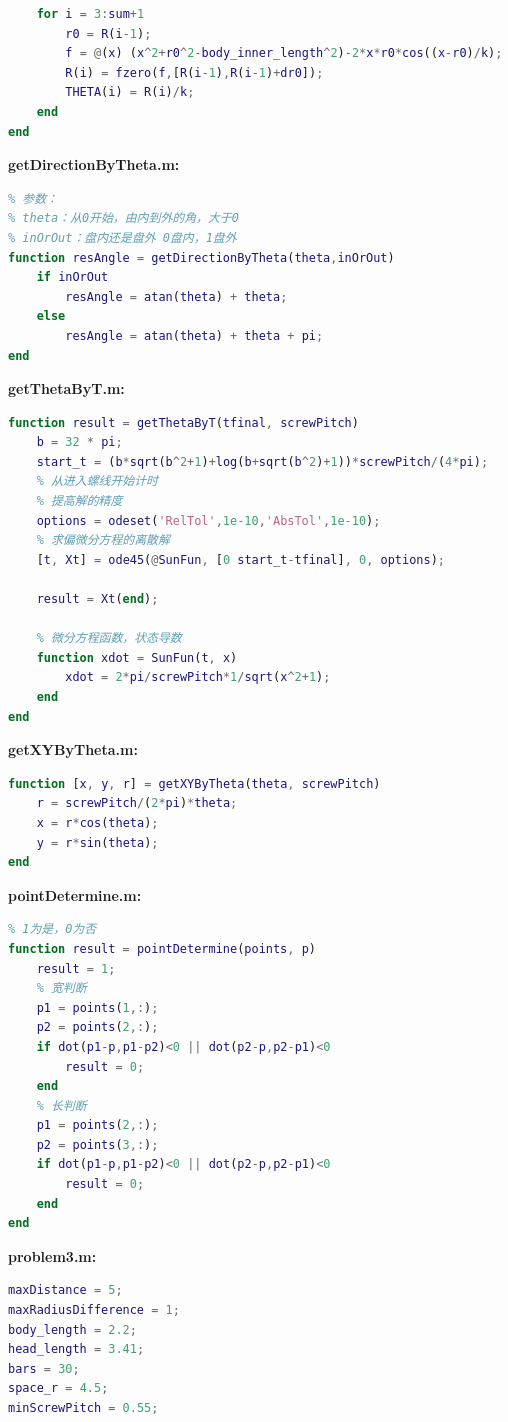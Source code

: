 \documentclass[withoutpreface,bwprint]{cumcmthesis} %
\begin{document}
\begin{appendices}
\begin{lstlisting}[language=matlab]
    % 其余把手
    for i = 3:sum+1
        r0 = R(i-1);
        f = @(x) (x^2+r0^2-body_inner_length^2)-2*x*r0*cos((x-r0)/k);
        R(i) = fzero(f,[R(i-1),R(i-1)+dr0]);
        THETA(i) = R(i)/k;
    end
end
\end{lstlisting}
\noindent\textbf{\textcolor[rgb]{0.98,0.00,0.00}{getDirectionByTheta.m:}}
\begin{lstlisting}[language=matlab]
% 通过theta角计算当前速度方向与x轴正方向的夹角
% 参数：
% theta：从0开始，由内到外的角，大于0
% inOrOut：盘内还是盘外 0盘内，1盘外
function resAngle = getDirectionByTheta(theta,inOrOut)
    if inOrOut
        resAngle = atan(theta) + theta;
    else
        resAngle = atan(theta) + theta + pi;
end
\end{lstlisting}
\noindent\textbf{\textcolor[rgb]{0.98,0.00,0.00}{getThetaByT.m:}}
\begin{lstlisting}[language=matlab]
function result = getThetaByT(tfinal, screwPitch)
    b = 32 * pi;
    start_t = (b*sqrt(b^2+1)+log(b+sqrt(b^2)+1))*screwPitch/(4*pi);
    % 从进入螺线开始计时
    % 提高解的精度
    options = odeset('RelTol',1e-10,'AbsTol',1e-10);
    % 求偏微分方程的离散解
    [t, Xt] = ode45(@SunFun, [0 start_t-tfinal], 0, options);   
    
    result = Xt(end);

    % 微分方程函数，状态导数
    function xdot = SunFun(t, x)
        xdot = 2*pi/screwPitch*1/sqrt(x^2+1);
    end
end
\end{lstlisting}
\noindent\textbf{\textcolor[rgb]{0.98,0.00,0.00}{getXYByTheta.m:}}
\begin{lstlisting}[language=matlab]
function [x, y, r] = getXYByTheta(theta, screwPitch)
    r = screwPitch/(2*pi)*theta;
    x = r*cos(theta);
    y = r*sin(theta);
end
\end{lstlisting}
\noindent\textbf{\textcolor[rgb]{0.98,0.00,0.00}{pointDetermine.m:}}
\begin{lstlisting}[language=matlab]
% 判断点是否在矩形内
% 1为是，0为否
function result = pointDetermine(points, p)
    result = 1;
    % 宽判断
    p1 = points(1,:);
    p2 = points(2,:);
    if dot(p1-p,p1-p2)<0 || dot(p2-p,p2-p1)<0
        result = 0;
    end
    % 长判断
    p1 = points(2,:);
    p2 = points(3,:);
    if dot(p1-p,p1-p2)<0 || dot(p2-p,p2-p1)<0
        result = 0;
    end
end
\end{lstlisting}
\noindent\textbf{\textcolor[rgb]{0.98,0.00,0.00}{problem3.m:}}
\begin{lstlisting}[language=matlab]
% 曼哈顿距离阈值
maxDistance = 5;
maxRadiusDifference = 1;
body_length = 2.2;
head_length = 3.41;
bars = 30;
space_r = 4.5;
minScrewPitch = 0.55;


\end{lstlisting}
\end{appendices}
\end{document}
